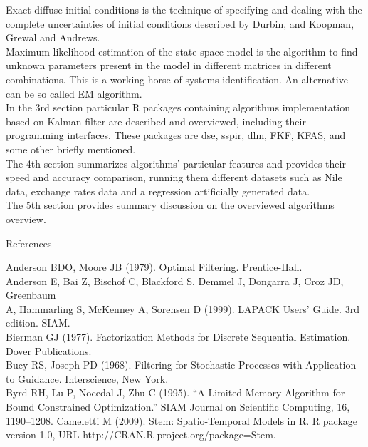 \documentclass[a4paper,14pt]{extarticle}
\begin{document}
Exact diffuse initial conditions is the technique of specifying and dealing
with the complete uncertainties of initial conditions described by Durbin,
and Koopman, Grewal and Andrews. \\

Maximum likelihood estimation of the state-space model is the algorithm to
find unknown parameters present in the model in different matrices in different
combinations. This is a working horse of systems identification. An alternative
can be so called EM algorithm. \\

In the 3rd section particular R packages containing
algorithms implementation based on Kalman filter are
described and overviewed, including their programming interfaces.
These packages are dse, sspir, dlm, FKF, KFAS, and
some other briefly mentioned. \\

The 4th section summarizes algorithms' particular features and provides their
speed and accuracy comparison, running them different datasets such as Nile
data, exchange rates data and a regression artificially generated data. \\

The 5th section provides summary discussion on the overviewed algorithms
overview.

\begin{center}
	References
\end{center}

Anderson BDO, Moore JB (1979). Optimal Filtering. Prentice-Hall. \\

Anderson E, Bai Z, Bischof C, Blackford S, Demmel J, Dongarra J, Croz JD, Greenbaum \\

A, Hammarling S, McKenney A, Sorensen D (1999). LAPACK Users’ Guide. 3rd edition.
SIAM. \\

Bierman GJ (1977). Factorization Methods for Discrete Sequential Estimation.
		Dover Publications. \\

Bucy RS, Joseph PD (1968). Filtering for Stochastic Processes with Application to Guidance.
Interscience, New York. \\

Byrd RH, Lu P, Nocedal J, Zhu C (1995). “A Limited Memory Algorithm for Bound
Constrained Optimization.” SIAM Journal on Scientific Computing, 16, 1190–1208.
Cameletti M (2009). Stem: Spatio-Temporal Models in R. R package version 1.0, URL
http://CRAN.R-project.org/package=Stem. \\
\end{document}
